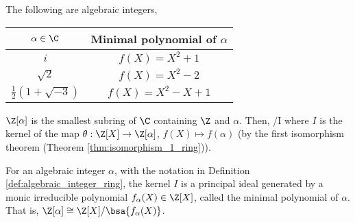 \begin{example}
The following are algebraic integers,%
\begin{center}
\begin{tabular}{cc}
$\alpha \in \C$ & \quad Minimal polynomial of $\alpha$ \quad\\
\hline
$i$ & $f(X) = X^2 + 1$\\
$\sqrt{2}$ &  $f(X) = X^2 - 2$\\
$\frac 12(1 +\sqrt{-3})$ & $f(X) = X^2 - X + 1$
\end{tabular}
\end{center}
\end{example}

\begin{definition}\label{def:algebraic_integer_ring}
$\Z[\alpha]$ is the smallest subring of $\C$ containing $\Z$ and $\alpha$. Then,
\be
\Z[\alpha] \cong \Z[X]/I
\ee
where $I$ is the kernel of the map $\theta : \Z[X] \to \Z[\alpha]$, $f(X) \mapsto  f(\alpha)$ (by the first isomorphism theorem (Theorem \ref{thm:isomorphism_1_ring})).%
\end{definition}


\begin{proposition}\label{pro:minimal_polynomial_of_algebraic_integer}
For an algebraic integer $\alpha$, with the notation in Definition \ref{def:algebraic_integer_ring}, the kernel $I$ is a principal ideal generated by a monic irreducible polynomial $f_\alpha(X) \in \Z[X]$, called the minimal polynomial of $\alpha$. That is, $\Z[\alpha] \cong \Z[X]/\bsa{f_\alpha(X)}$.
\end{proposition}

